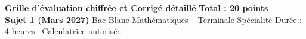 \documentclass[a4paper,11pt]{article}
\begin{document}
\begin{tcolorbox}[
    enhanced,
    colback=bleufond,
    colframe=bleuprimaire,
    arc=1.6mm,
    boxrule=0.8pt,
    top=4pt, bottom=4pt, left=8pt, right=8pt
]
    \textbf{\Large\textcolor{bleuprimaire}{Grille d'évaluation chiffrée et Corrigé détaillé}} \hfill \textbf{\Large\textcolor{bleuprimaire}{Total : 20 points}} \\[0.15em]
    \textbf{\textcolor{bleusecondaire}{Sujet 1 (Mars 2027)}} \hspace{0.2cm}\textcolor{grisaccent}{\textbullet}\hspace{0.2cm} \textcolor{grisaccent}{Bac Blanc Mathématiques -- Terminale Spécialité} \hfill \small\textcolor{grisaccent}{Durée : 4 heures \textbullet\ Calculatrice autorisée}
\end{tcolorbox}
\vspace{0.10cm}
\end{document}
